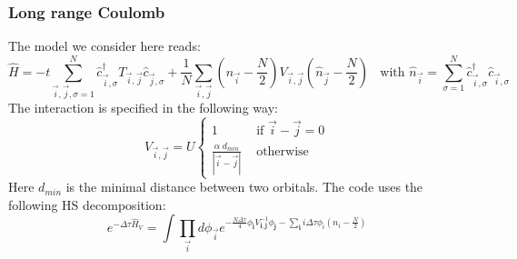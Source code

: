 \subsubsection{  Long range Coulomb }

The model we consider here reads: 
\begin{equation}
	\hat{H}  = -t \sum_{\vec{i},\vec{j},\sigma=1}^{N}   \hat{c}^{\dagger}_{\vec{i},\sigma}  T_{\vec{i},\vec{j}} \hat{c}^{}_{\vec{j},\sigma}   +     
	\frac{1} { N } \sum_{\vec{i},\vec{j}}  \left(  \hat{n}_{\vec{i}} -  \frac{N}{2}  \right)  V_{\vec{i},\vec{j}} \left(  \hat{n}_{\vec{j}} -  \frac{N}{2}  \right) \; \; 
	\text{ with }  \hat{n}_{\vec{i}} = \sum_{\sigma=1}^{N}  \hat{c}^{\dagger}_{\vec{i},\sigma}  \hat{c}^{}_{\vec{i},\sigma}
\end{equation}
The interaction is specified in the following way: 
\begin{equation}
	V_{\vec{i}, \vec{j}}   =   U \left\{
	\begin{array}{ll}  
	1          &   \text{ if } \vec{i} - \vec{j}    = 0 \\
	\frac{\alpha   \;   d_{min}}{ |   \vec{i} - \vec{j} | } &     \text{ otherwise }
	\end{array}
\right.
\end{equation}
Here $d_{min}$ is the minimal distance between two orbitals.     The code uses the following  HS decomposition:
\begin{equation}
e^{-\Delta \tau \hat{H}_V }  =  \int \prod_{\vec{i}} d \phi_{\vec{i}}   e^{ - \frac{N \Delta \tau} {4} \phi_{\pmb{i}} V^{-1}_{\pmb{i},\pmb{j}}  \phi_{\pmb{j}} - \sum_{\pmb{i}}  i \Delta \tau \phi_i \left( n_{i} - \frac{N}{2} \right) } 
\end{equation}


